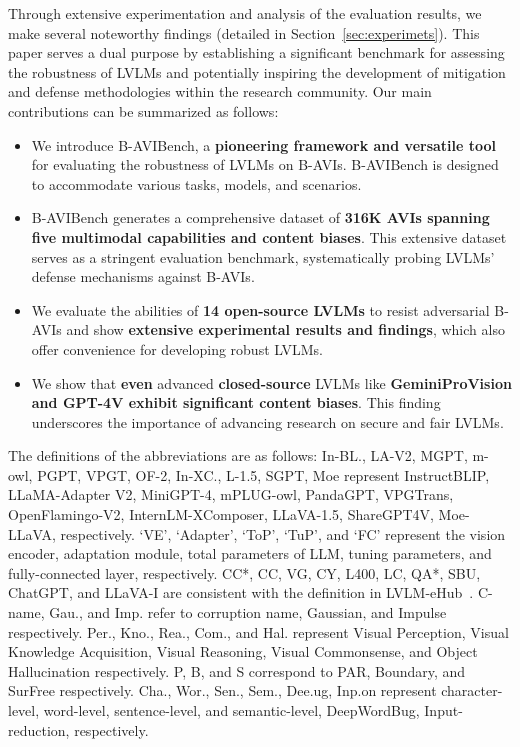 Through extensive experimentation and analysis of the evaluation results, we make several noteworthy findings (detailed in Section~\ref{sec:experimets}). This paper serves a dual purpose by establishing a significant benchmark for assessing the robustness of LVLMs and potentially inspiring the development of mitigation and defense methodologies within the research community. Our main contributions can be summarized as follows:

\begin{itemize}
\item We introduce B-AVIBench, a \textbf{pioneering framework and versatile tool} for evaluating the robustness of LVLMs on B-AVIs. B-AVIBench is designed to accommodate various tasks, models, and scenarios.
\item B-AVIBench generates a comprehensive dataset of \textbf{316K AVIs spanning five multimodal capabilities and content biases}. This extensive dataset serves as a stringent evaluation benchmark, systematically probing LVLMs' defense mechanisms against B-AVIs.
\item We evaluate the abilities of \textbf{14 open-source LVLMs} to resist adversarial B-AVIs and show \textbf{extensive experimental results and findings}, which also offer convenience for developing robust LVLMs. 
\item  We show that \textbf{even} advanced \textbf{closed-source} LVLMs like \textbf{GeminiProVision and GPT-4V exhibit significant content biases}. This finding underscores the importance of advancing research on secure and fair LVLMs.
\end{itemize}

The definitions of the abbreviations are as follows:
In-BL., LA-V2, MGPT, m-owl, PGPT, VPGT, OF-2, In-XC., L-1.5, SGPT, Moe represent InstructBLIP, LLaMA-Adapter V2, MiniGPT-4, mPLUG-owl, PandaGPT, VPGTrans, OpenFlamingo-V2, InternLM-XComposer, LLaVA-1.5, ShareGPT4V, Moe-LLaVA, respectively.
`VE', `Adapter', `ToP', `TuP', and `FC' represent the vision encoder, adaptation module, total parameters of LLM, tuning parameters, and fully-connected layer, respectively.
CC*, CC, VG, CY, L400, LC, QA*, SBU, ChatGPT, and LLaVA-I are consistent with the definition in LVLM-eHub~\cite{shao2023tiny}. 
C-name, Gau., and Imp. refer to corruption name, Gaussian, and Impulse respectively.
Per., Kno., Rea., Com., and Hal. represent Visual Perception, Visual Knowledge Acquisition, Visual Reasoning, Visual Commonsense, and Object Hallucination respectively. P, B, and S correspond to PAR, Boundary, and SurFree respectively.
Cha., Wor., Sen., Sem., Dee.ug, Inp.on represent character-level, word-level, sentence-level, and semantic-level, DeepWordBug, Input-reduction, respectively.


